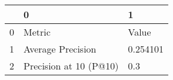 \begin{tabular}{lll}
\toprule
{} &                       0 &         1 \\
\midrule
0 &                  Metric &     Value \\
1 &       Average Precision &  0.254101 \\
2 &  Precision at 10 (P@10) &       0.3 \\
\bottomrule
\end{tabular}
